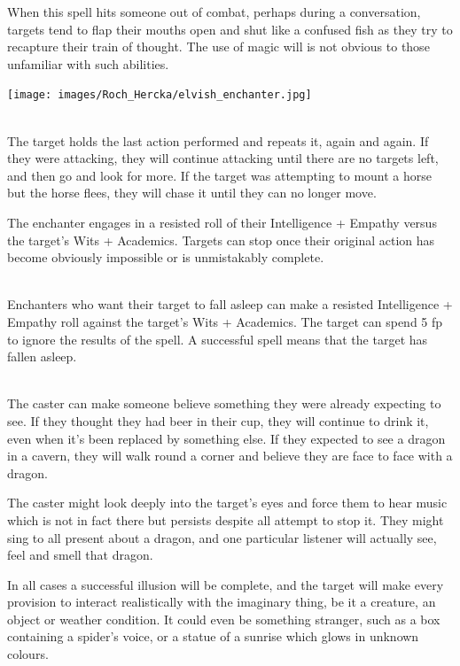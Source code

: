 \begin{multicols}{2}
{When this spell hits someone out of combat, perhaps during a conversation, targets tend to flap their mouths open and shut like a confused fish as they try to recapture their train of thought. The use of magic will is not obvious to those unfamiliar with such abilities.

\noindent\texttt{[image: images/Roch\_Hercka/elvish\_enchanter.jpg]}
\label{roch:enchanter}

}{}

\\
The target holds the last action performed and repeats it, again and again.
If they were attacking, they will continue attacking until there are no targets left, and then go and look for more.
If the target was attempting to mount a horse but the horse flees, they will chase it until they can no longer move.

The enchanter engages in a resisted roll of their Intelligence + Empathy versus the target's Wits + Academics.
Targets can stop once their original action has become obviously impossible or is unmistakably complete.

\spelllevel

\\
Enchanters who want their target to fall asleep can make a resisted Intelligence + Empathy roll against the target's Wits + Academics.
The target can spend 5 \gls{fp} to ignore the results of the spell. A successful spell means that the target has fallen asleep.

\\
The caster can make someone believe something they were already expecting to see.
If they thought they had beer in their cup, they will continue to drink it, even when it's been replaced by something else.
If they expected to see a dragon in a cavern, they will walk round a corner and believe they are face to face with a dragon.

The caster might look deeply into the target's eyes and force them to hear music which is not in fact there but persists despite all attempt to stop it. They might sing to all present about a dragon, and one particular listener will actually see, feel and smell that dragon.

In all cases a successful illusion will be complete, and the target will make every provision to interact realistically with the imaginary thing, be it a creature, an object or weather condition. It could even be something stranger, such as a box containing a spider's voice, or a statue of a sunrise which glows in unknown colours.


\end{multicols}

